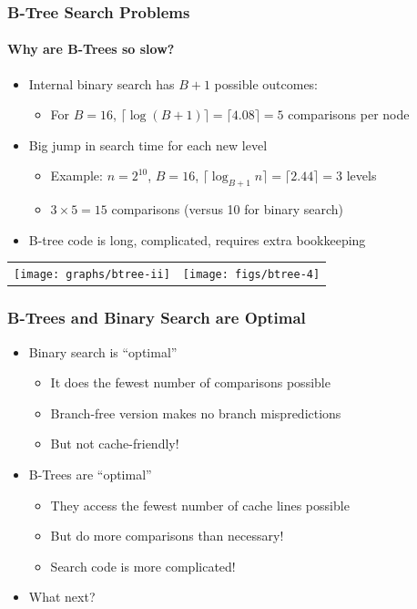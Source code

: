 \documentclass[xcolor=dvipsnames]{beamer}
\begin{document}
\begin{frame}
   \frametitle{B-Tree Search Problems}
   \framesubtitle{Why are B-Trees so slow?}
    
   \begin{itemize}[<+->]
      \item Internal binary search has $B+1$ possible outcomes:
      \begin{itemize}
        \item For $B=16$, 
                  $\lceil\log(B+1)\rceil = \lceil 4.08\rceil = 5$ comparisons per node
      \end{itemize}
      \item Big jump in search time for each new level 
      \begin{itemize}
        \item Example: $n=2^{10}$, $B=16$, 
                  $\lceil\log_{B+1}n\rceil = \lceil 2.44\rceil = 3$ levels
        \item $3\times 5 = 15$ comparisons (versus 10 for binary search)
      \end{itemize}
      \item B-tree code is long, complicated, requires extra bookkeeping
   \end{itemize}
   \begin{tabular}{m{}m{}}
      \texttt{[image: graphs/btree-ii]}
     & \texttt{[image: figs/btree-4]}
   \end{tabular}
   
\end{frame}


\begin{frame}
   \frametitle{B-Trees and Binary Search are Optimal}

   \begin{itemize}
     \item<+-> Binary search is ``optimal''
     \begin{itemize}
       \item It does the fewest number of comparisons possible
       \item Branch-free version makes no branch mispredictions
       \item But not cache-friendly!
     \end{itemize}
     \item<+-> B-Trees are ``optimal''
     \begin{itemize}
       \item They access the fewest number of cache lines possible
       \item But do more comparisons than necessary!
       \item Search code is more complicated!
     \end{itemize}
     \item<+-> What next?
   \end{itemize}
\end{frame}
\end{document}
